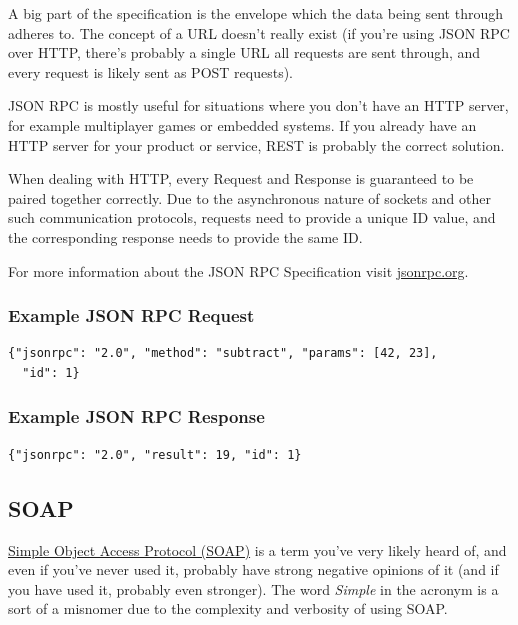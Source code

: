 \documentclass{book}
\begin{document}
A big part of the specification is the envelope which the data being sent through adheres to. The concept of a URL doesn't really exist (if you're using JSON RPC over HTTP, there's probably a single URL all requests are sent through, and every request is likely sent as POST requests).

JSON RPC is mostly useful for situations where you don't have an HTTP server, for example multiplayer games or embedded systems. If you already have an HTTP server for your product or service, REST is probably the correct solution.

When dealing with HTTP, every Request and Response is guaranteed to be paired together correctly. Due to the asynchronous nature of sockets and other such communication protocols, requests need to provide a unique ID value, and the corresponding response needs to provide the same ID.

For more information about the JSON RPC Specification visit \href{http://www.jsonrpc.org/specification}{jsonrpc.org}.

\subsubsection{Example JSON RPC Request}

\begin{verbatim}
{"jsonrpc": "2.0", "method": "subtract", "params": [42, 23],
  "id": 1}
\end{verbatim}

\subsubsection{Example JSON RPC Response}

\begin{verbatim}
{"jsonrpc": "2.0", "result": 19, "id": 1}
\end{verbatim}


\subsection{SOAP}

\href{https://en.wikipedia.org/wiki/SOAP}{Simple Object Access Protocol (SOAP)} is a term you've very likely heard of, and even if you've never used it, probably have strong negative opinions of it (and if you have used it, probably even stronger). The word \emph{Simple} in the acronym is a sort of a misnomer due to the complexity and verbosity of using SOAP.
\end{document}
